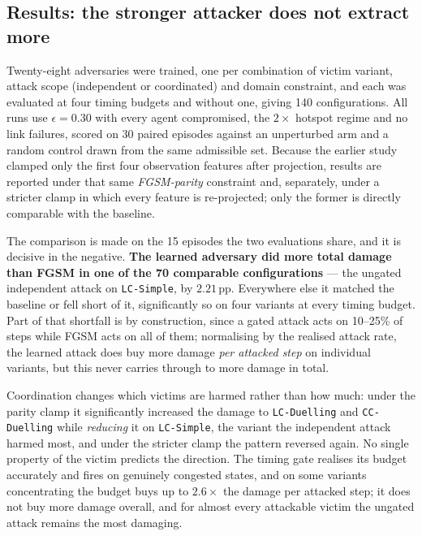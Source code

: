 \documentclass[10pt,journal,comsoc]{IEEEtran}
\begin{document}
\subsection{Results: the stronger attacker does not extract more}
\label{sec:learned-results}
Twenty-eight adversaries were trained, one per combination of victim variant, attack
scope (independent or coordinated) and domain constraint, and each was evaluated at four
timing budgets and without one, giving 140 configurations. All runs use $\epsilon{=}0.30$
with every agent compromised, the $2\times$ hotspot regime and no link failures, scored
on 30 paired episodes against an unperturbed arm and a random control drawn from the same
admissible set. Because the earlier study clamped only the first four observation features
after projection, results are reported under that same \emph{FGSM-parity} constraint and,
separately, under a stricter clamp in which every feature is re-projected; only the former
is directly comparable with the baseline.

The comparison is made on the 15 episodes the two evaluations share, and it is decisive in
the negative. \textbf{The learned adversary did more total damage than FGSM in one of the
70 comparable configurations} --- the ungated independent attack on \texttt{LC-Simple}, by
$2.21$\,pp. Everywhere else it matched the baseline or fell short of it, significantly so
on four variants at every timing budget. Part of that shortfall is by construction, since a
gated attack acts on 10--25\% of steps while FGSM acts on all of them; normalising by the
realised attack rate, the learned attack does buy more damage \emph{per attacked step} on
individual variants, but this never carries through to more damage in total.

Coordination changes which victims are harmed rather than how much: under the parity clamp
it significantly increased the damage to \texttt{LC-Duelling} and \texttt{CC-Duelling} while
\emph{reducing} it on \texttt{LC-Simple}, the variant the independent attack harmed most,
and under the stricter clamp the pattern reversed again. No single property of the victim
predicts the direction. The timing gate realises its budget accurately and fires on
genuinely congested states, and on some variants concentrating the budget buys up to
$2.6\times$ the damage per attacked step; it does not buy more damage overall, and for
almost every attackable victim the ungated attack remains the most damaging.
\end{document}
